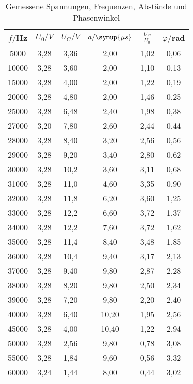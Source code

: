 \begin{table}[H]
  \centering
  \caption{Gemessene Spannungen, Frequenzen, Abstände und Phasenwinkel}
  \label{tab:Spannungsamplitude}
  \begin{tabular}{c c c c c c}
    \toprule
    $f/$Hz & $U_0/V$ & $U_C/V$ & $a/\symup{\mu s}$ & $\frac{U_C}{U_0}$ & $\varphi/$rad   \\
    \midrule
    5000 & 3,28  &  3,36  &  2,00  &  1,02  &  0,06   \\
   10000 & 3,28  &  3,60  &  2,00  &  1,10  &  0,13   \\
   15000 & 3,28  &  4,00  &  2,00  &  1,22  &  0,19   \\
   20000 & 3,28  &  4,80  &  2,00  &  1,46  &  0,25   \\
   25000 & 3,28  &  6,48  &  2,40  &  1,98  &  0,38   \\
   27000 & 3,20  &  7,80  &  2,60  &  2,44  &  0,44   \\
   28000 & 3,28  &  8,40  &  3,20  &  2,56  &  0,56   \\
   29000 & 3,28  &  9,20  &  3,40  &  2,80  &  0,62   \\
   30000 & 3,28  &  10,2  &  3,60  &  3,11  &  0,68   \\
   31000 & 3,28  &  11,0  &  4,60  &  3,35  &  0,90   \\
   32000 & 3,28  &  11,8  &  6,20  &  3,60  &  1,25   \\
   33000 & 3,28  &  12,2  &  6,60  &  3,72  &  1,37   \\
   34000 & 3,28  &  12,2  &  7,60  &  3,72  &  1,62   \\
   35000 & 3,28  &  11,4  &  8,40  &  3,48  &  1,85   \\
   36000 & 3,28  &  10,4  &  9,40  &  3,17  &  2,13   \\
   37000 & 3,28  &  9.40  &  9,80  &  2,87  &  2,28   \\
   38000 & 3,28  &  8,20  &  9,80  &  2,50  &  2,34   \\
   39000 & 3,28  &  7,20  &  9,80  &  2,20  &  2,40   \\
   40000 & 3,28  &  6,40  &  10,20 &  1,95  &  2,56   \\
   45000 & 3,28  &  4,00  &  10,40 &  1,22  &  2,94   \\
   50000 & 3,28  &  2,56  &  9,80  &  0,78  &  3,08   \\
   55000 & 3,28  &  1,84  &  9,60  &  0,56  &  3,32   \\
   60000 & 3,24  &  1,44  &  8,00  &  0,44  &  3,02   \\
    \bottomrule
  \end{tabular}
\end{table}

